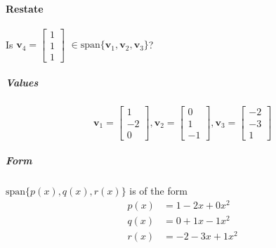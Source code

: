 \documentclass{article}
\begin{document}
        \paragraph{Restate}
            Is $\mathbf{v}_4=\begin{bmatrix}1\\1\\1\end{bmatrix}$
            $\in \text{span}\{\mathbf{v}_1, \mathbf{v}_2, \mathbf{v}_3\}$?
            \subparagraph{Values}
                \[
                    \mathbf{v}_1=\begin{bmatrix} 1\\-2\\ 0\end{bmatrix},
                    \mathbf{v}_2=\begin{bmatrix} 0\\ 1\\-1\end{bmatrix},
                    \mathbf{v}_3=\begin{bmatrix}-2\\ -3\\1\end{bmatrix}
                \]
            \subparagraph{Form}
                $\text{span}\{p(x),q(x),r(x)\}$
                is of the form
                \begin{align*}
                    p(x) &= 1 - 2x + 0x^2\\
                    q(x) &= 0 + 1x - 1x^2\\
                    r(x) &= -2 - 3x + 1x^2
                \end{align*}
\end{document}
